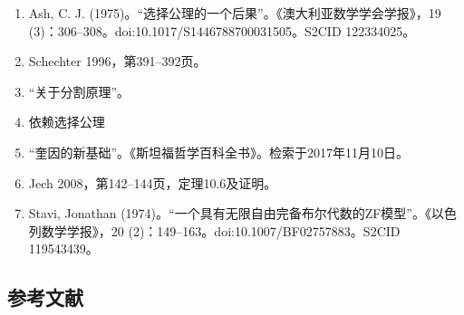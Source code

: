 \begin{enumerate}
\item Ash, C. J. (1975)。“选择公理的一个后果”。《澳大利亚数学学会学报》，19 (3)：306–308。doi:10.1017/S1446788700031505。S2CID 122334025。  
\item Schechter 1996，第391–392页。  
\item “关于分割原理”。  
\item 依赖选择公理  
\item “奎因的新基础”。《斯坦福哲学百科全书》。检索于2017年11月10日。  
\item Jech 2008，第142–144页，定理10.6及证明。  
\item Stavi, Jonathan (1974)。“一个具有无限自由完备布尔代数的ZF模型”。《以色列数学学报》，20 (2)：149–163。doi:10.1007/BF02757883。S2CID 119543439。
\end{enumerate} 
\subsection{参考文献} 
